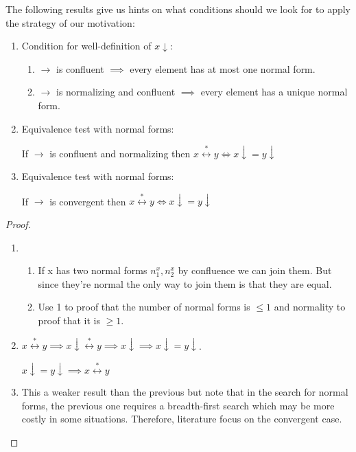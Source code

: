 \begin{proposition}
The following results give us hints on what conditions should we look for to apply the strategy of our motivation:

\begin{enumerate}
\item Condition for well-definition of $x\downarrow$:

\begin{enumerate}
\item $\to$ is confluent $\implies$ every element has at most one normal form.
\item $\to$ is normalizing and confluent $\implies$ every element has a unique normal form.
\end{enumerate}

\item Equivalence test with normal forms:

If $\to$ is confluent and normalizing then $x \stackrel{*}{\leftrightarrow} y \iff x\downarrow = y\downarrow$

\item Equivalence test with normal forms:

If $\to$ is convergent then $x \stackrel{*}{\leftrightarrow} y \iff x\downarrow = y\downarrow$
\end{enumerate}
\end{proposition}
\begin{proof}
\begin{enumerate}
\item 

\begin{enumerate}
\item If x has two normal forms $n_1^x,n_2^x$ by confluence we can join them. But since they're normal the only way to join them is that they are equal.
\item Use 1 to proof that the number of normal forms is $\le 1$ and normality to proof that it is $\ge 1$.
\end{enumerate}

\item $x \stackrel{*}{\leftrightarrow} y \implies x \downarrow \stackrel{*}{\leftrightarrow} y \implies x \downarrow \implies x \downarrow = y \downarrow$.

$x \downarrow = y \downarrow \implies x \stackrel{*}{\leftrightarrow} y$


\item This a weaker result than the previous but note that in the search for normal forms, the previous one requires a breadth-first search which may be more costly in some situations. Therefore, literature focus on the convergent case. 
\end{enumerate}
\end{proof}


